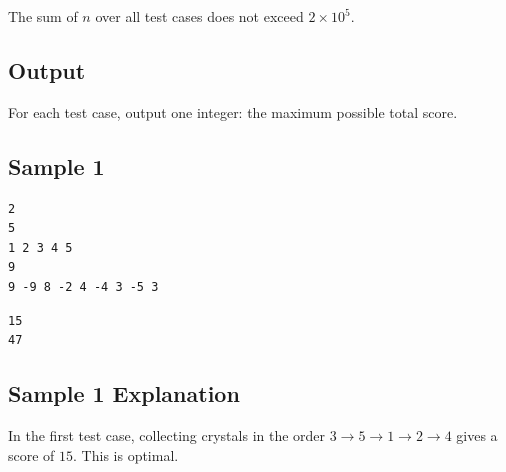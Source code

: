 The sum of $n$ over all test cases does not exceed $2 \times 10^5$.

\subsection{Output}

For each test case, output one integer: the maximum possible total score.

\subsection{Sample 1}

\begin{minipage}{\linewidth}
	\begin{minipage}[t]{0.49\linewidth}
		\begin{lstlisting}[title=\texttt{standard input}]
2
5
1 2 3 4 5
9
9 -9 8 -2 4 -4 3 -5 3
\end{lstlisting}
	\end{minipage}
	\begin{minipage}[t]{0.49\linewidth}
		\begin{lstlisting}[title=\texttt{standard output}]
15
47
\end{lstlisting}
	\end{minipage}
\end{minipage}

\subsection{Sample 1 Explanation}

In the first test case, collecting crystals in the order $3 \to 5 \to 1 \to 2 \to 4$ gives a score of $15$. This is optimal.
